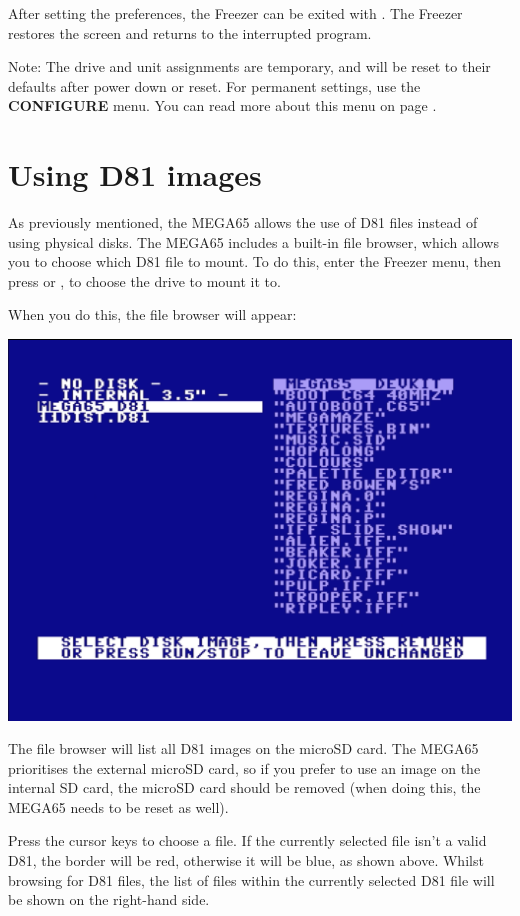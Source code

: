 After setting the preferences, the Freezer can be exited
with . The Freezer restores the screen and
returns to the interrupted program.

Note: The drive and unit assignments are temporary, and will be reset to their defaults
after power down or reset. For permanent settings, use the {\bf CONFIGURE}
menu. You can read more about this menu on page \pageref{configuring-chipset}.

\section{Using D81 images}
As previously mentioned, the MEGA65 allows the use of D81 files instead of using physical disks. The MEGA65 includes a
built-in file browser, which allows you to choose which D81 file to mount. To do this, enter the Freezer menu,
then press  or , to choose the drive to mount it to.

When you do this, the file browser will appear:

\begin{center}
\includegraphics[trim= 10mm 20mm 10mm 20mm,clip,width=0.7\linewidth]{images/d81-file-browser.png}
\end{center}

The file browser will list all D81 images on the microSD card. The MEGA65 prioritises the external microSD card, so if you
prefer to use an image on the internal SD card, the microSD card should be removed (when doing this, the MEGA65 needs
to be reset as well).

Press the cursor keys to choose a file. If the currently selected file isn't a valid D81, the border will be red,
otherwise it will be blue, as shown above. Whilst browsing for D81 files, the list of files within the currently
selected D81 file will be shown on the right-hand side.


